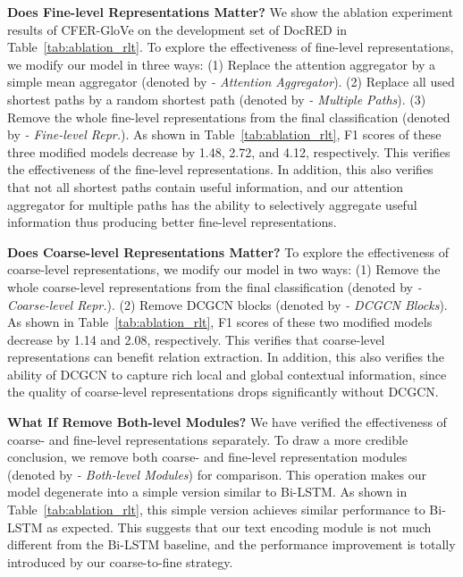 \documentclass[letterpaper]{article} \usepackage{aaai21}  \usepackage{times}  \usepackage{helvet} \usepackage{courier}  \usepackage[hyphens]{url}  \usepackage{graphicx} \urlstyle{rm} \def\UrlFont{\rm}  \usepackage{natbib}  \usepackage{caption} \frenchspacing  \setlength{\pdfpagewidth}{8.5in}  \setlength{\pdfpageheight}{11in}
\begin{document}
\noindent\textbf{Does Fine-level Representations Matter? }
We show the ablation experiment results of CFER-GloVe on the development set of DocRED in Table~\ref{tab:ablation_rlt}. 
To explore the effectiveness of fine-level representations, we modify our model in three ways: 
(1) Replace the attention aggregator by a simple mean aggregator (denoted by \textit{- Attention Aggregator}). 
(2) Replace all used shortest paths by a random shortest path (denoted by \textit{- Multiple Paths}). 
(3) Remove the whole fine-level representations from the final classification (denoted by \textit{- Fine-level Repr.}). 
As shown in Table~\ref{tab:ablation_rlt}, F1 scores of these three modified models decrease by 1.48, 2.72, and 4.12, respectively. 
This verifies the effectiveness of the fine-level representations. 
In addition, this also verifies that not all shortest paths contain useful information, and our attention aggregator for multiple paths has the ability to selectively aggregate useful information thus producing better fine-level representations. 

\noindent\textbf{Does Coarse-level Representations Matter? }
To explore the effectiveness of coarse-level representations, we modify our model in two ways: 
(1) Remove the whole coarse-level representations from the final classification (denoted by \textit{-  Coarse-level Repr.}). 
(2) Remove DCGCN blocks (denoted by \textit{- DCGCN Blocks}). 
As shown in Table~\ref{tab:ablation_rlt}, F1 scores of these two modified models decrease by 1.14 and 2.08, respectively. 
This verifies that coarse-level representations can benefit relation extraction. 
In addition, this also verifies the ability of DCGCN to capture rich local and global contextual information, since the quality of coarse-level representations drops significantly without DCGCN. 

\noindent\textbf{What If Remove Both-level Modules? }
We have verified the effectiveness of coarse- and fine-level representations separately. 
To draw a more credible conclusion, we remove both coarse- and fine-level representation modules (denoted by \textit{-  Both-level Modules}) for comparison. 
This operation makes our model degenerate into a simple version similar to Bi-LSTM. 
As shown in Table~\ref{tab:ablation_rlt}, this simple version achieves similar performance to Bi-LSTM as expected. 
This suggests that our text encoding module is not much different from the Bi-LSTM baseline, and the performance improvement is totally introduced by our coarse-to-fine strategy. 
\end{document}
